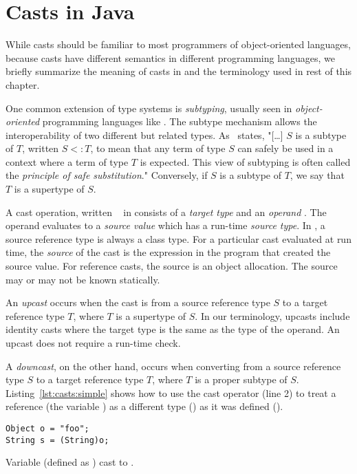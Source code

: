 \section{Casts in Java}
\label{sec:casts:background}

While casts should be familiar to most programmers of object-oriented languages, 
because casts have different semantics in different programming languages,
we briefly summarize the meaning of casts in \java{} and the terminology used in rest of this chapter.

One common extension of type systems is \emph{subtyping},
usually seen in \emph{object-oriented} programming languages like \java{}.
The subtype mechanism allows the interoperability of two different but related types.
As~\cite{pierceTypesProgrammingLanguages2002} states,
"[\ldots] $S$ is a subtype of $T$, written $S <: T$,
to mean that any term of type $S$ can safely be used in a context where a term of type $T$ is expected.
This view of subtyping is often called the \emph{principle of safe substitution}."
Conversely, if $S$ is a subtype of $T$, we say that $T$ is a supertype of $S$.

A cast operation, written ~ in \java{}
consists of a \emph{target type}  and an \emph{operand} .
The operand evaluates to a \emph{source value} which has a run-time
\emph{source type}.
In \java{}, a source reference type is always a class type.
For a particular cast evaluated at run time, 
the \emph{source} of the cast is the expression in the program that
created the source value.
For reference casts, the source is an object allocation.
The source may or may not be known statically.

An \emph{upcast} occurs when the cast is from a source reference type $S$ to a target reference type $T$,
where $T$ is a supertype of $S$.
In our terminology, upcasts include identity casts where the target type
is the same as the type of the operand.
An upcast does not require a run-time check.

A \emph{downcast}, on the other hand,
occurs when converting from a source reference type $S$ to a target reference
type $T$, where $T$ is a proper subtype of $S$.
Listing~\ref{lst:casts:simple} shows how to use the cast operator (line 2) to treat a reference (the variable ) as a different type () as it was defined ().

\begin{listing}
\begin{verbatim}
Object o = "foo"; 
String s = (String)o;
\end{verbatim}
\caption{Variable  (defined as ) cast to .}
\label{lst:casts:simple}
\end{listing}

